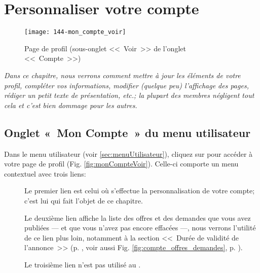 \chapter{Personnaliser votre compte}\label{chap:personnaliserCompte}
\begin{figure}
    \texttt{[image: 144-mon\_compte\_voir]}
    \caption[Page de profil]{Page de profil (sous-onglet <<~Voir~>> de l'onglet <<~Compte~>>)}
    \label{fig:monCompteVoir}
\end{figure}

{\slshape
\noindent Dans ce chapitre, nous verrons comment mettre à jour les éléments de votre profil, compléter vos informations, modifier (quelque peu) l'affichage des pages, rédiger un petit texte de présentation, etc.; la plupart des membres négligent tout cela et c'est bien dommage pour les autres.}

\section[Onglet «~Mon Compte~»]{Onglet «~Mon Compte~» du menu utilisateur}\label{page:compte_offres_demandes}

Dans le menu utilisateur (voir \vref{sec:menuUtilisateur}), cliquez sur  pour accéder à votre page de profil (Fig. \vref{fig:monCompteVoir}). Celle-ci comporte un menu contextuel avec trois liens:

\begin{description}
    \item[] Le premier lien est celui où s'effectue la personnalisation de votre compte; c'est lui qui fait l'objet de ce chapitre.
    \item[] Le deuxième lien affiche la liste des offres et des demandes que vous avez publiées --- et que vous n’avez pas encore effacées ---, nous verrons l'utilité de ce lien plus loin, notamment à la section <<~Durée de validité de l'annonce~>> (p. \pageref{sec:dureeValiditeAnnonce}, voir aussi Fig. \ref{fig:compte_offres_demandes}, p. \pageref{fig:compte_offres_demandes}).
    \item[] Le troisième lien n’est pas utilisé au \CdS. 
\end{description}


